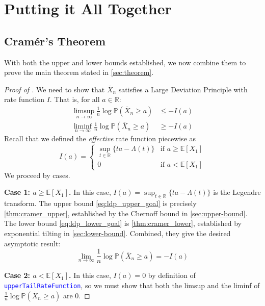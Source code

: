 \documentclass{article}
\newcommand{\leancode}[1]{\textcolor{blue}{\nolinkurl{#1}}}
\newcommand{\E}{\mathbb{E}}
\renewcommand{\P}{\mathbb{P}}
\newcommand{\R}{\mathbb{R}}
\begin{document}
\section{Putting it All Together}
\label{sec:main-result}
\subsection{Cram{\'e}r's Theorem}

With both the upper and lower bounds established, we now combine them to prove the main theorem stated in \cref{sec:theorem}.

\begin{proof}[Proof of ]
  We need to show that $\overline{X}_n$ satisfies a Large Deviation Principle with rate function
  $I$. That is, for all $a \in \R$:
  \begin{align}
    \limsup_{n \to \infty} \frac{1}{n} \log \P(\overline{X}_n \ge a) &\le -I(a) \label{eq:ldp_upper_goal} \\
    \liminf_{n \to \infty} \frac{1}{n} \log \P(\overline{X}_n \ge a) &\ge -I(a) \label{eq:ldp_lower_goal}
  \end{align}
  Recall that we defined the \emph{effective} rate function piecewise as
  \begin{equation}
    I(a) =
    \begin{cases} \sup_{t \in \R} \{ta - \Lambda(t)\} & \text{if } a \ge \E[X_1] \\ 0 & \text{if } a < \E[X_1]
    \end{cases}
  \end{equation}
  We proceed by cases.

  \textbf{Case 1: $a \ge \E[X_1]$.}
  In this case, $I(a) = \sup_{t \in \R}\{ta - \Lambda(t)\}$ is the Legendre transform. The upper bound \eqref{eq:ldp_upper_goal} is precisely \cref{thm:cramer_upper}, established by the Chernoff bound in \cref{sec:upper-bound}. The lower bound \eqref{eq:ldp_lower_goal} is \cref{thm:cramer_lower}, established by exponential tilting in \cref{sec:lower-bound}.
  Combined, they give the desired asymptotic result:
  \begin{equation}
    \lim_{n \to \infty} \frac{1}{n} \log \P(\overline{X}_n \ge a) = -I(a)
  \end{equation}

  \textbf{Case 2: $a < \E[X_1]$.}
  In this case, $I(a) = 0$ by definition of \leancode{upperTailRateFunction}, so we must show that both the limsup and the liminf of $\frac{1}{n}\log\P(\overline{X}_n \ge a)$ are 0.


\end{proof}
\end{document}
